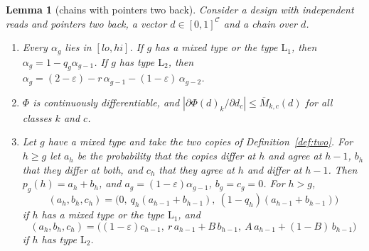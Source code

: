 \documentclass[11pt]{amsart}
\newtheorem{lemma}[theorem]{Lemma}
\theoremstyle{definition}
\theoremstyle{remark}
\newcommand{\eps}{\varepsilon}
\begin{document}
\begin{lemma}[chains with pointers two back]\label{lem:twochain}
Consider a design with independent reads and pointers two back, a vector
$d\in[0,1]^{\mathcal C}$ and a chain over $d$.
\begin{enumerate}[label=(\alph*),leftmargin=2.4em]
\item Every $\alpha_g$ lies in $[lo,hi]$. If $g$ has a mixed type or the type $\mathrm L_1$,
then $\alpha_g=1-q_g\alpha_{g-1}$. If $g$ has type $\mathrm L_2$, then
$\alpha_g=(2-\eps)-r\,\alpha_{g-1}-(1-\eps)\,\alpha_{g-2}$.
\item $\Phi$ is continuously differentiable, and
$|\partial\Phi(d)_k/\partial d_c|\le\overline M_{k,c}(d)$ for all classes $k$ and $c$.
\item Let $g$ have a mixed type and take the two copies of Definition~\ref{def:two}. For
$h\ge g$ let $a_h$ be the probability that the copies differ at $h$ and agree at $h-1$, $b_h$
that they differ at both, and $c_h$ that they agree at $h$ and differ at $h-1$. Then
$p_g(h)=a_h+b_h$, and $a_g=(1-\eps)\alpha_{g-1}$, $b_g=c_g=0$. For $h>g$,
\[
(a_h,b_h,c_h)=\bigl(0,\ q_h(a_{h-1}+b_{h-1}),\ (1-q_h)(a_{h-1}+b_{h-1})\bigr)
\]
if $h$ has a mixed type or the type $\mathrm L_1$, and
\[
(a_h,b_h,c_h)=\bigl((1-\eps)c_{h-1},\ r\,a_{h-1}+B\,b_{h-1},\ A\,a_{h-1}+(1-B)\,b_{h-1}\bigr)
\]
if $h$ has type $\mathrm L_2$.
\end{enumerate}
\end{lemma}
\end{document}
